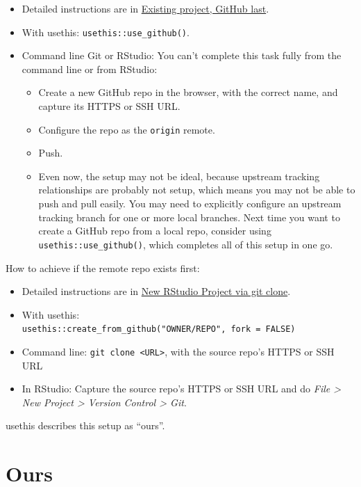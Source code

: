 \documentclass[
]{book}
\providecommand{\tightlist}{%
  \setlength{\itemsep}{0pt}\setlength{\parskip}{0pt}}
\begin{document}
\begin{itemize}
\tightlist
\item
  Detailed instructions are in
  \hyperref[existing-github-last]{Existing project, GitHub last}.
\item
  With usethis: \texttt{usethis::use\_github()}.
\item
  Command line Git or RStudio: You can't complete this task fully from the
  command line or from RStudio:

  \begin{itemize}
  \tightlist
  \item
    Create a new GitHub repo in the browser, with the correct name,
    and capture its HTTPS or SSH URL.
  \item
    Configure the repo as the \texttt{origin} remote.
  \item
    Push.
  \item
    Even now, the setup may not be ideal, because upstream tracking
    relationships are probably not setup, which means you may not be able to
    push and pull easily. You may need to explicitly configure an upstream
    tracking branch for one or more local branches. Next time you want to
    create a GitHub repo from a local repo, consider using
    \texttt{usethis::use\_github()}, which completes all of this setup in one go.
  \end{itemize}
\end{itemize}

How to achieve if the remote repo exists first:

\begin{itemize}
\tightlist
\item
  Detailed instructions are in
  \hyperref[git-clone-usethis-rstudio]{New RStudio Project via git clone}.
\item
  With usethis: \texttt{usethis::create\_from\_github("OWNER/REPO",\ fork\ =\ FALSE)}
\item
  Command line: \texttt{git\ clone\ \textless{}URL\textgreater{}}, with the source repo's HTTPS or SSH URL
\item
  In RStudio: Capture the source repo's HTTPS or SSH URL and do
  \emph{File \textgreater{} New Project \textgreater{} Version Control \textgreater{} Git}.
\end{itemize}

usethis describes this setup as ``ours''.

\section{Ours}\label{ours-them}
\end{document}
